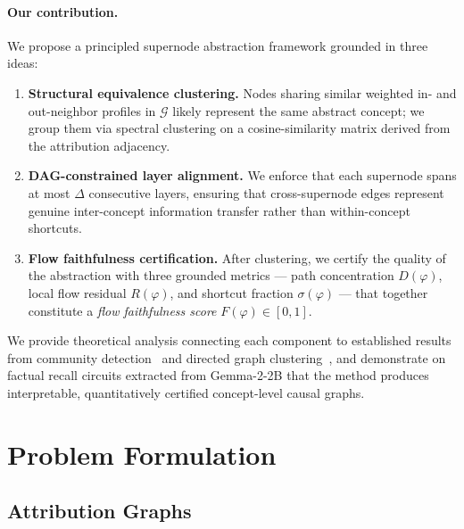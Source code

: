 \documentclass[11pt]{article}
\newcommand{\cG}{\mathcal{G}}
\newcommand{\1}{\mathbbm{1}}
\begin{document}
\paragraph{Our contribution.}
We propose a principled supernode abstraction framework grounded in three ideas:
\begin{enumerate}[leftmargin=2em]
  \item \textbf{Structural equivalence clustering.}
        Nodes sharing similar weighted in- and out-neighbor profiles in $\cG$ likely represent the same abstract concept; we group them via spectral clustering on a cosine-similarity matrix derived from the attribution adjacency.

  \item \textbf{DAG-constrained layer alignment.}
        We enforce that each supernode spans at most $\Delta$ consecutive layers, ensuring that cross-supernode edges represent genuine inter-concept information transfer rather than within-concept shortcuts.

  \item \textbf{Flow faithfulness certification.}
        After clustering, we certify the quality of the abstraction with three grounded metrics — path concentration $D(\varphi)$, local flow residual $R(\varphi)$, and shortcut fraction $\sigma(\varphi)$ — that together constitute a \emph{flow faithfulness score} $F(\varphi) \in [0,1]$.
\end{enumerate}

We provide theoretical analysis connecting each component to established results from community detection~\citep{abbe2018community} and directed graph clustering~\citep{rohe2016co}, and demonstrate on factual recall circuits extracted from Gemma-2-2B that the method produces interpretable, quantitatively certified concept-level causal graphs.

\section{Problem Formulation}
\label{sec:problem}

\subsection{Attribution Graphs}
\label{sec:attr-graph}
\end{document}
